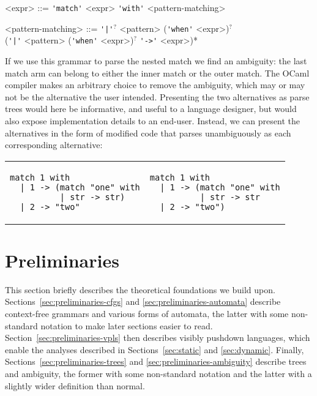 \documentclass[acmsmall,review,anonymous]{acmart}\settopmatter{printfolios=true,printccs=false,printacmref=false}
\begin{document}
\setlength{\grammarindent}{9.5em}
\begin{grammar}
<expr> ::= \verb|'match'| <expr> \verb|'with'| <pattern-matching>

<pattern-matching> ::= \verb{'|'{$^{?}$ <pattern> (\verb|'when'| <expr>)$^{?}$ \\
(\verb{'|'{ <pattern> (\verb|'when'| <expr>)$^{?}$ \verb|'->'| <expr>)*
\end{grammar}

\noindent If we use this grammar to parse the nested match we find an ambiguity: the last match arm can belong to either the inner match or the outer match. The OCaml compiler makes an arbitrary choice to remove the ambiguity, which may or may not be the alternative the user intended. Presenting the two alternatives as parse trees would here be informative, and useful to a language designer, but would also expose implementation details to an end-user. Instead, we can present the alternatives in the form of modified code that parses unambiguously as each corresponding alternative:

\begin{center}
\begin{tabular}{l|l}
\begin{lstlisting}[language={[objective]caml}]
match 1 with
  | 1 -> (match "one" with
          | str -> str)
  | 2 -> "two"
\end{lstlisting} &
\begin{lstlisting}[language={[objective]caml}]
match 1 with
  | 1 -> (match "one" with
          | str -> str
  | 2 -> "two")
\end{lstlisting} \\
\end{tabular}
\end{center}

\section{Preliminaries}

This section briefly describes the theoretical foundations we build upon. Sections~\ref{sec:preliminaries-cfgs} and \ref{sec:preliminaries-automata} describe context-free grammars and various forms of automata, the latter with some non-standard notation to make later sections easier to read. Section~\ref{sec:preliminaries-vpls} then describes visibly pushdown languages, which enable the analyses described in Sections~\ref{sec:static} and \ref{sec:dynamic}. Finally, Sections~\ref{sec:preliminaries-trees} and \ref{sec:preliminaries-ambiguity} describe trees and ambiguity, the former with some non-standard notation and the latter with a slightly wider definition than normal.
\end{document}
